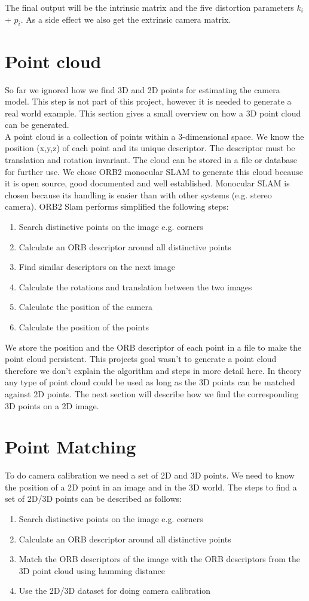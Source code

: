 \documentclass[11pt,a4paper,titlepage,oneside]{report}
\begin{document}
The final output will be the intrinsic matrix and the five distortion parameters $k_i$ + $p_i$. As a side effect we also get the extrinsic camera matrix.

\section{Point cloud}
So far we ignored how we find 3D and 2D points for estimating the camera model. This step is not part of this project, however it is needed to generate a real world example. This section gives a small overview on how a 3D point cloud can be generated.\\
A point cloud is a collection of points within a 3-dimensional space. We know the position (x,y,z) of each point and its unique descriptor. The descriptor must be translation and rotation invariant. The cloud can be stored in a file or database for further use. We chose ORB2 monocular SLAM \cite{orbslam2} to generate this cloud because it is open source, good documented and well established. Monocular SLAM is chosen because its handling is easier than with other systems (e.g. stereo camera). ORB2 Slam performs simplified the following steps:
\begin{enumerate}
	\item Search distinctive points on the image e.g. corners
	\item Calculate an ORB descriptor around all distinctive points
	\item Find similar descriptors on the next image
	\item Calculate the rotations and translation between the two images
	\item Calculate the position of the camera
	\item Calculate the position of the points
\end{enumerate}
We store the position and the ORB descriptor of each point in a file to make the point cloud persistent.
This projects goal wasn't to generate a point cloud therefore we don't explain the algorithm and steps in more detail here. In theory any type of point cloud could be used as long as the 3D points can be matched against 2D points. The next section will describe how we find the corresponding 3D points on a 2D image.

\section{Point Matching}
To do camera calibration we need a set of 2D and 3D points. We need to know the position of a 2D point in an image and in the 3D world. The steps to find a set of 2D/3D points can be described as follows:
\begin{enumerate}
	\item Search distinctive points on the image e.g. corners
	\item Calculate an ORB descriptor around all distinctive points
	\item Match the ORB descriptors of the image with the ORB descriptors from the 3D point cloud using hamming distance
	\item Use the 2D/3D dataset for doing camera calibration
\end{enumerate}
\end{document}
